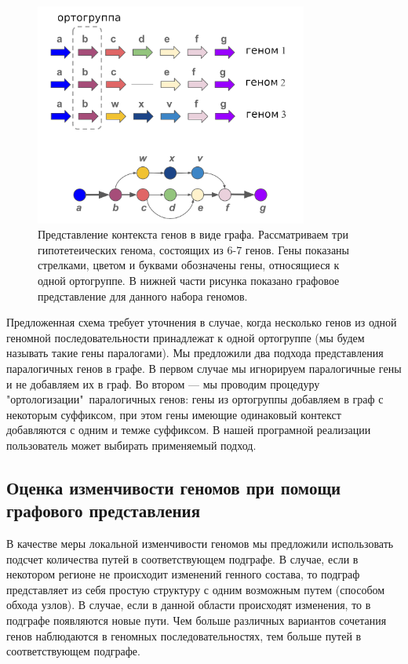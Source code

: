\begin{figure}[!ht] 
  \center
    \includegraphics[width=0.8\textwidth]{Dissertation/images/graph/graph_scheme.png}
  \caption{Представление контекста генов в виде графа. Рассматриваем три гипотетеических генома, состоящих из 6-7 генов. Гены показаны стрелками, цветом и буквами обозначены гены, относящиеся к одной ортогруппе. В нижней части рисунка показано графовое представление для данного набора геномов.}
  \label{img:scheme} 
\end{figure}

Предложенная схема требует уточнения в случае, когда несколько генов из одной геномной последовательности принадлежат к одной ортогруппе (мы будем называть такие гены паралогами). Мы предложили два подхода представления паралогичных генов в графе. В первом случае мы игнорируем паралогичные гены и не добавляем их в граф. Во втором --- мы проводим процедуру "ортологизации"\ паралогичных генов: гены из ортогруппы добавляем в граф с некоторым суффиксом, при этом гены имеющие одинаковый контекст добавляются с одним и темже суффиксом. В нашей програмной реализации пользователь может выбирать применяемый подход. 

\subsection*{Оценка изменчивости геномов при помощи графового представления}
В качестве меры локальной изменчивости геномов мы предложили использовать подсчет количества путей в соответствующем подграфе. В случае, если в некотором регионе не происходит изменений генного состава, то подграф представляет из себя простую структуру с одним возможным путем (способом обхода узлов). В случае, если в данной области происходят изменения, то в подграфе появляются новые пути. Чем больше различных вариантов сочетания генов наблюдаются в геномных последовательностях, тем больше путей в соответствующем подграфе. 

